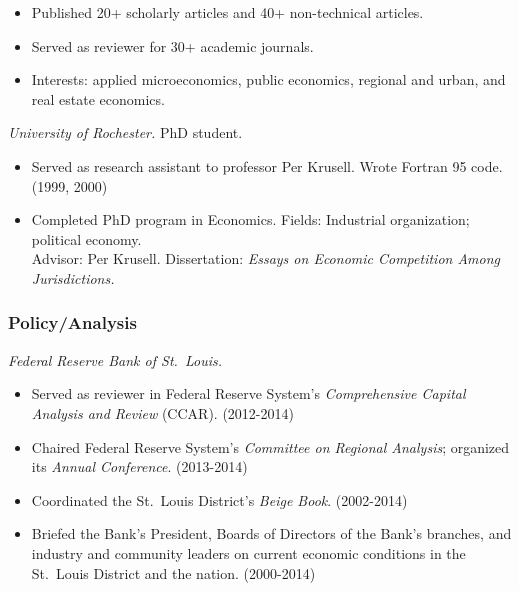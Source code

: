 \documentclass[10pt,]{article}
\begin{document}
\begin{itemize}
\itemsep1pt\parskip0pt
\item
  Published 20+ scholarly articles and 40+ non-technical articles.
\item
  Served as reviewer for 30+ academic journals.
\item
  Interests: applied microeconomics, public economics, regional and
  urban, and real estate economics.
\end{itemize}

\begin{description}
\itemsep1pt\parskip0pt
\item[1995-2000]
\emph{University of Rochester.} PhD student.
\end{description}

\begin{itemize}
\itemsep1pt\parskip0pt
\item
  Served as research assistant to professor Per Krusell. Wrote Fortran
  95 code. (1999, 2000)
\item
  Completed PhD program in Economics. Fields: Industrial organization;
  political economy.\\ Advisor: Per Krusell. Dissertation: \emph{Essays
  on Economic Competition Among Jurisdictions.}
\end{itemize}

\subsubsection{Policy/Analysis}\label{policyanalysis}

\begin{description}
\itemsep1pt\parskip0pt
\item[2000-2015]
\emph{Federal Reserve Bank of St.~Louis.}
\end{description}

\begin{itemize}
\itemsep1pt\parskip0pt
\item
  Served as reviewer in Federal Reserve System's \emph{Comprehensive
  Capital Analysis and Review} (CCAR). (2012-2014)
\item
  Chaired Federal Reserve System's \emph{Committee on Regional
  Analysis}; organized its \emph{Annual Conference}. (2013-2014)
\item
  Coordinated the St.~Louis District's \emph{Beige Book}. (2002-2014)
\item
  Briefed the Bank's President, Boards of Directors of the Bank's
  branches, and industry and community leaders on current economic
  conditions in the St.~Louis District and the nation. (2000-2014)
\end{itemize}
\end{document}
